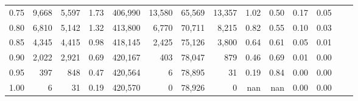 \begin{tabular}{rrrrrrrrrrrrrr}
0.75 &   9,668 &  5,597 &    1.73 &  406,990 &   13,580 &  65,569 &  13,357 &  1.02 &  0.50 &  0.17 &      0.05 \\
0.80 &   6,810 &  5,142 &    1.32 &  413,800 &    6,770 &  70,711 &   8,215 &  0.82 &  0.55 &  0.10 &      0.03 \\
0.85 &   4,345 &  4,415 &    0.98 &  418,145 &    2,425 &  75,126 &   3,800 &  0.64 &  0.61 &  0.05 &      0.01 \\
0.90 &   2,022 &  2,921 &    0.69 &  420,167 &      403 &  78,047 &     879 &  0.46 &  0.69 &  0.01 &      0.00 \\
0.95 &     397 &    848 &    0.47 &  420,564 &        6 &  78,895 &      31 &  0.19 &  0.84 &  0.00 &      0.00 \\
1.00 &       6 &     31 &    0.19 &  420,570 &        0 &  78,926 &       0 &   nan &   nan &  0.00 &      0.00 \\
\bottomrule
\end{tabular}
